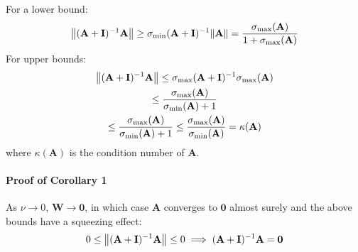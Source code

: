 \documentclass[mnsc,blindrev]{informs3}
\begin{document}
            \noindent For a lower bound:
            \begin{gather*}
                \norm{(\mathbf{A} + \mathbf{I})^{-1}\mathbf{A}} \geq \sigma_{\min}{(\mathbf{A} + \mathbf{I})^{-1}} \norm{\mathbf{A}} 
                = \frac{\sigma_{\max}(\mathbf{A})}{1 + \sigma_{\max}(\mathbf{A})} %
            \end{gather*}
            For upper bounds:
            \begin{gather*}
                \norm{(\mathbf{A} + \mathbf{I})^{-1}\mathbf{A}} \leq \sigma_{\max}{(\mathbf{A} + \mathbf{I})^{-1}} \sigma_{\max}(\mathbf{A}) \\
                \leq \frac{\sigma_{\max}(\mathbf{A})}{\sigma_{\min}(\mathbf{A})+1} \\
                \leq \frac{\sigma_{\max}(\mathbf{A})}{\sigma_{\min}(\mathbf{A})+1}
                \leq \frac{\sigma_{\max}(\mathbf{A})}{\sigma_{\min}(\mathbf{A})} = \kappa(\mathbf{A})
            \end{gather*}
            where $\kappa(\mathbf{A})$ is the condition number of $\mathbf{A}$. 
    
        \paragraph{Proof of Corollary 1}
            As $\nu \rightarrow 0$, $\mathbf{W} \rightarrow \mathbf{0}$, in which case $\mathbf{A}$ converges to $\mathbf{0}$ almost surely and the above bounds have a squeezing effect:
            \begin{equation*}
                0 \leq \norm{(\mathbf{A} + \mathbf{I})^{-1}\mathbf{A}} \leq 0 \implies (\mathbf{A} + \mathbf{I})^{-1}\mathbf{A} = \mathbf{0}
            \end{equation*}
    
    
\end{document}
